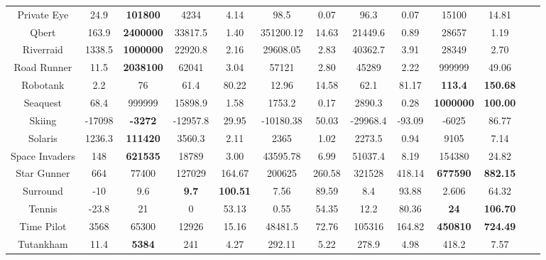 \documentclass[nohyperref]{article}
\theoremstyle{plain}
\begin{document}
\begin{table}[!hb]
\begin{center}
\begin{tabular}{|c| c| c| c c| c c| c c| c c| c c|}
 Private Eye        & 24.9      & \textbf{101800}    & 4234     &4.14    & 98.5       & 0.07       & 96.3    & 0.07              &15100           &14.81\\
 Qbert              & 163.9     & \textbf{2400000}   & 33817.5  &1.40    & 351200.12  & 14.63      & 21449.6 & 0.89              &28657           &1.19\\
 Riverraid          & 1338.5    & \textbf{1000000}   & 22920.8  &2.16    & 29608.05   & 2.83       & 40362.7 & 3.91              &28349           &2.70\\
 Road Runner        & 11.5      & \textbf{2038100}   & 62041    &3.04    & 57121      & 2.80       & 45289   & 2.22              &999999          &49.06\\
 Robotank           & 2.2       & 76        & 61.4     &80.22   & 12.96      & 14.58      & 62.1    & 81.17      &\textbf{113.4}           &\textbf{150.68}\\
 Seaquest           & 68.4      & 999999    & 15898.9  &1.58    & 1753.2     & 0.17       & 2890.3  & 0.28      &\textbf{1000000}          &\textbf{100.00}\\
 Skiing             & -17098    & \textbf{-3272}     & -12957.8 &29.95   & -10180.38  & 50.03      & -29968.4& -93.09            &-6025	          &86.77\\
 Solaris            & 1236.3    & \textbf{111420}    & 3560.3   &2.11    & 2365       & 1.02       & 2273.5  & 0.94                &9105            &7.14\\
 Space Invaders     & 148       & \textbf{621535 }   & 18789    &3.00    & 43595.78   & 6.99       & 51037.4 & 8.19            &154380          &24.82\\
 Star Gunner        & 664       & 77400     & 127029   &164.67  & 200625     & 260.58     & 321528  & 418.14    &\textbf{677590} &\textbf{882.15}\\
 Surround           & -10       & 9.6       & \textbf{9.7}      &\textbf{100.51}  & 7.56       & 89.59      & 8.4     & 93.88           &2.606           &64.32\\
 Tennis             & -23.8     & 21        & 0        &53.13   & 0.55       & 54.35      & 12.2    & 80.36     &\textbf{24}  &\textbf{106.70}\\
 Time Pilot         & 3568      & 65300     & 12926    &15.16   & 48481.5    & 72.76      & 105316  & 164.82          &\textbf{450810} &\textbf{724.49}\\
 Tutankham          & 11.4      & \textbf{5384}      & 241      &4.27    & 292.11     & 5.22       & 278.9   & 4.98            &418.2           &7.57\\

\end{tabular}
\end{center}
\end{table}
\end{document}
